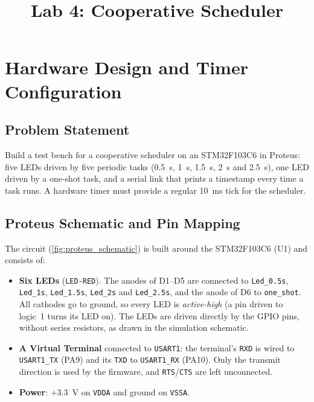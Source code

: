 \documentclass[twoside,final]{hcmut-report}
\title{Lab 4: Cooperative Scheduler}
\begin{document}
\coverpage%

\tableofcontents
\listoffigures
\listoftables
\lstlistoflistings{}

\clearpage

\section{Hardware Design and Timer Configuration}
\subsection{Problem Statement}
Build a test bench for a cooperative scheduler on an STM32F103C6 in Proteus: five LEDs driven by five periodic tasks (0.5~s, 1~s, 1.5~s, 2~s and 2.5~s), one LED driven by a one-shot task, and a serial link that prints a timestamp every time a task runs. A hardware timer must provide a regular 10~ms tick for the scheduler.

\subsection{Proteus Schematic and Pin Mapping}
The circuit (\cref{fig:proteus_schematic}) is built around the STM32F103C6 (U1) and consists of:
\begin{itemize}
    \item \textbf{Six LEDs} (\texttt{LED-RED}). The anodes of D1--D5 are connected to \texttt{Led\_0.5s}, \texttt{Led\_1s}, \texttt{Led\_1.5s}, \texttt{Led\_2s} and \texttt{Led\_2.5s}, and the anode of D6 to \texttt{one\_shot}. All cathodes go to ground, so every LED is \emph{active-high} (a pin driven to logic~1 turns its LED on). The LEDs are driven directly by the GPIO pins, without series resistors, as drawn in the simulation schematic.
    \item \textbf{A Virtual Terminal} connected to \texttt{USART1}: the terminal's \texttt{RXD} is wired to \texttt{USART1\_TX} (PA9) and its \texttt{TXD} to \texttt{USART1\_RX} (PA10). Only the transmit direction is used by the firmware, and \texttt{RTS}/\texttt{CTS} are left unconnected.
    \item \textbf{Power}: +3.3~V on \texttt{VDDA} and ground on \texttt{VSSA}.
\end{itemize}
\end{document}
